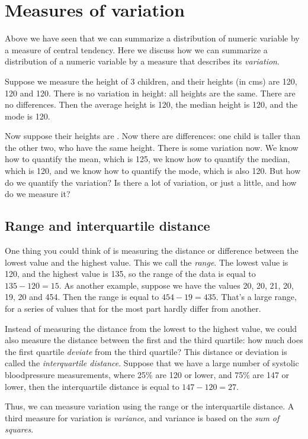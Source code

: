 \documentclass[]{report}\usepackage[]{graphicx}\usepackage[]{color}
\begin{document}
\section{Measures of variation}

Above we have seen that we can summarize a distribution of numeric variable by a measure of central tendency. Here we discuss how we can summarize a distribution of a numeric variable by a measure that describes its \textit{variation}.

Suppose we measure the height of 3 children, and their heights (in cms) are 120, 120 and 120. There is no variation in height: all heights are the same. There are no differences. Then the average height is 120, the median height is 120, and the mode is 120.

Now suppose their heights are . Now there are differences: one child is taller than the other two, who have the same height. There is some variation now. We know how to quantify the mean, which is 125, we know how to quantify the median, which is 120, and we know how to quantify the mode, which is also 120. But how do we quantify the variation? Is there a lot of variation, or just a little, and how do we measure it?

\subsection{Range and interquartile distance}

One thing you could think of is measuring the distance or difference between the lowest value and the highest value. This we call the \textit{range}. The lowest value is 120, and the highest value is 135, so the range of the data is equal to $135-120=15$. As another example, suppose we have the values 20, 20, 21, 20, 19, 20 and 454. Then the range is equal to $454-19=435$. That's a large range, for a series of values that for the most part hardly differ from another.

Instead of measuring the distance from the lowest to the highest value, we could also measure the distance between the first and the third quartile: how much does the first quartile \textit{deviate} from the third quartile? This distance or deviation is called the \textit{interquartile distance}. Suppose that we have a large number of systolic bloodpressure measurements, where 25\% are 120 or lower, and 75\% are 147 or lower, then the interquartile distance is equal to $147-120=27$.

Thus, we can measure variation using the range or the interquartile distance. A third measure for variation is \textit{variance}, and variance is based on the \textit{sum of squares}.
\end{document}

